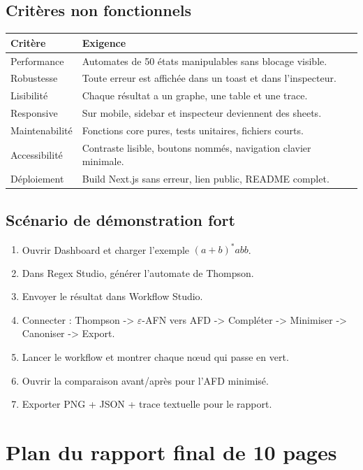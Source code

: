 \documentclass[11pt,a4paper]{report}
\newcommand{\eps}{\ensuremath{\varepsilon}}
\begin{document}
\section{Critères non fonctionnels}
\begin{longtable}{p{}p{}}
\toprule
\textbf{Critère} & \textbf{Exigence}\\
\midrule
Performance & Automates de 50 états manipulables sans blocage visible.\\
Robustesse & Toute erreur est affichée dans un toast et dans l'inspecteur.\\
Lisibilité & Chaque résultat a un graphe, une table et une trace.\\
Responsive & Sur mobile, sidebar et inspecteur deviennent des sheets.\\
Maintenabilité & Fonctions core pures, tests unitaires, fichiers courts.\\
Accessibilité & Contraste lisible, boutons nommés, navigation clavier minimale.\\
Déploiement & Build Next.js sans erreur, lien public, README complet.\\
\bottomrule
\end{longtable}

\section{Scénario de démonstration fort}
\begin{enumerate}
  \item Ouvrir Dashboard et charger l'exemple $(a+b)^*abb$.
  \item Dans Regex Studio, générer l'automate de Thompson.
  \item Envoyer le résultat dans Workflow Studio.
  \item Connecter : Thompson -> \eps-AFN vers AFD -> Compléter -> Minimiser -> Canoniser -> Export.
  \item Lancer le workflow et montrer chaque nœud qui passe en vert.
  \item Ouvrir la comparaison avant/après pour l'AFD minimisé.
  \item Exporter PNG + JSON + trace textuelle pour le rapport.
\end{enumerate}

\chapter{Plan du rapport final de 10 pages}
\end{document}
